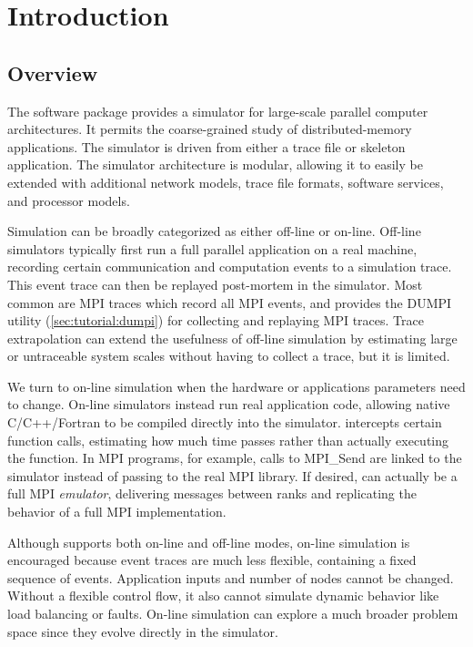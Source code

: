 
\chapter{Introduction}
\label{sec:intro}

\section{Overview}
\label{sec:intro:overview}

The \sstmacro software package provides a simulator for large-scale parallel computer architectures. 
It permits the coarse-grained study of distributed-memory applications. 
The simulator is driven from either a trace file or skeleton application. 
The simulator architecture is modular, allowing it to easily be extended with additional network models, 
trace file formats, software services, and processor models.

Simulation can be broadly categorized as either off-line or on-line.
Off-line simulators typically first run a full parallel application on a real machine,
recording certain communication and computation events to a simulation trace.
This event trace can then be replayed post-mortem in the simulator.
Most common are MPI traces which record all MPI events, and
\sstmacro provides the DUMPI utility (\ref{sec:tutorial:dumpi}) for collecting and replaying MPI traces. 
Trace extrapolation can extend the usefulness of off-line simulation by estimating large or untraceable system scales without   
having to collect a trace, but it is limited.

We turn to on-line simulation when the hardware or applications parameters need to change.
On-line simulators instead run real application code, allowing native C/C++/Fortran to be compiled directly into the simulator.
\sstmacro intercepts certain function calls, estimating how much time passes rather than actually executing the function.
In MPI programs, for example, calls to MPI\_Send are linked to the simulator instead of passing to the real MPI library.
If desired, \sstmacro can actually be a full MPI \emph{emulator}, delivering messages between ranks and replicating the behavior of a full MPI implementation.

Although \sstmacro supports both on-line and off-line modes, on-line simulation is encouraged because
event traces are much less flexible, containing a fixed sequence of events.
Application inputs and number of nodes cannot be changed. 
Without a flexible control flow, it also cannot simulate dynamic behavior like load balancing or faults.
On-line simulation can explore a much broader problem space since they evolve directly in the simulator.

